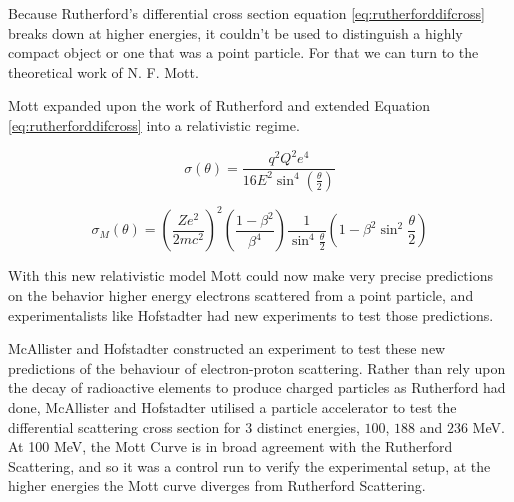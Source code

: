 \documentclass[12pt]{article}
\begin{document}
Because Rutherford's differential cross section equation \ref{eq:rutherforddifcross} breaks down at higher energies, it couldn't be used to distinguish a highly compact object or one that was a point particle. For that we can turn to the theoretical work of N. F. Mott.

Mott expanded upon the work of Rutherford and extended Equation \ref{eq:rutherforddifcross} into a relativistic regime\cite{Hofstadter1956}.

\begin{equation}\label{eq:rutherforddifcross}
    \sigma(\theta) = \frac{q^2Q^2e^4}{16E^2\sin^4(\frac{\theta}{2})}
\end{equation}

\begin{equation}\label{eq:mottscatter}
    \sigma_M(\theta) = (\frac{Ze^2}{2mc^2})^2(\frac{1-\beta^2}{\beta^4})\frac{1}{\sin^4{\frac{\theta}{2}}}(1-\beta^2\sin^2\frac{\theta}{2})
\end{equation}

With this new relativistic model Mott could now make very precise predictions on the behavior higher energy electrons scattered from a point particle, and experimentalists like Hofstadter had new experiments to test those predictions. 

McAllister and Hofstadter constructed an experiment to test these new predictions of the behaviour of electron-proton scattering.
Rather than rely upon the decay of radioactive elements to produce charged particles as Rutherford had done, McAllister and Hofstadter utilised a particle accelerator to test the differential scattering cross section for 3 distinct energies, $100$, $188$ and $236$ MeV.
At 100 MeV, the Mott Curve is in broad agreement with the Rutherford Scattering, and so it was a control run to verify the experimental setup, at the higher energies the Mott curve diverges from Rutherford Scattering.
\end{document}
